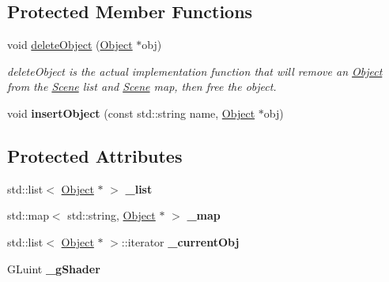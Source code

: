 \subsection*{Protected Member Functions}
\begin{DoxyCompactItemize}
\item 
void \hyperlink{class_scene_ad3897f8ac658af62c133783b2c4eaee4}{delete\-Object} (\hyperlink{class_object}{Object} $\ast$obj)
\begin{DoxyCompactList}\small\item\em delete\-Object is the actual implementation function that will remove an \hyperlink{class_object}{Object} from the \hyperlink{class_scene}{Scene} list and \hyperlink{class_scene}{Scene} map, then free the object. \end{DoxyCompactList}\item 
\hypertarget{class_scene_ab64354bd8059bab589ca2dbf9de9e66c}{void {\bfseries insert\-Object} (const std\-::string name, \hyperlink{class_object}{Object} $\ast$obj)}\label{class_scene_ab64354bd8059bab589ca2dbf9de9e66c}

\end{DoxyCompactItemize}
\subsection*{Protected Attributes}
\begin{DoxyCompactItemize}
\item 
\hypertarget{class_scene_acdd0123ca6b2d64d8d447bb485b235fc}{std\-::list$<$ \hyperlink{class_object}{Object} $\ast$ $>$ {\bfseries \-\_\-list}}\label{class_scene_acdd0123ca6b2d64d8d447bb485b235fc}

\item 
\hypertarget{class_scene_a8bd5d86484a12255b26b92b6cbf8d29a}{std\-::map$<$ std\-::string, \hyperlink{class_object}{Object} $\ast$ $>$ {\bfseries \-\_\-map}}\label{class_scene_a8bd5d86484a12255b26b92b6cbf8d29a}

\item 
\hypertarget{class_scene_ae87ca5350fcc595f3f15a4fd3c39f3d9}{std\-::list$<$ \hyperlink{class_object}{Object} $\ast$ $>$\-::iterator {\bfseries \-\_\-current\-Obj}}\label{class_scene_ae87ca5350fcc595f3f15a4fd3c39f3d9}

\item 
\hypertarget{class_scene_a8f9bdd8ec5edb1f414fbd314a36e2724}{G\-Luint {\bfseries \-\_\-g\-Shader}}\label{class_scene_a8f9bdd8ec5edb1f414fbd314a36e2724}

\end{DoxyCompactItemize}

